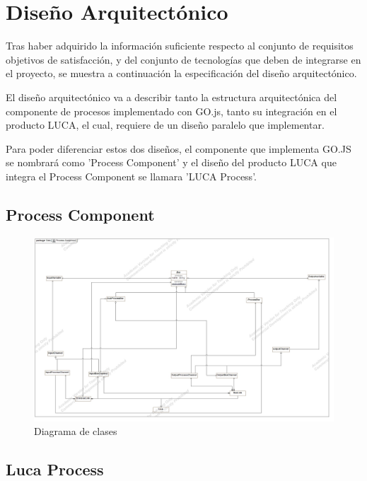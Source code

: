 \documentclass[a4paper,12pt]{book}
\begin{document}
	
	\clearpage
	
	\chapter{Diseño Arquitectónico}
	
	Tras haber adquirido la información suficiente respecto al conjunto de requisitos objetivos de satisfacción, y del conjunto de tecnologías que deben de integrarse en el proyecto, se muestra a continuación la especificación del diseño arquitectónico.
	
	\vspace{5mm}
	
	El diseño arquitectónico va a describir tanto la estructura arquitectónica del componente de procesos implementado con GO.js, tanto su integración en el producto LUCA, el cual, requiere de un diseño paralelo que implementar.
	
	
	\minitoc
	
	
	Para poder diferenciar estos dos diseños, el componente que implementa GO.JS se nombrará como 'Process Component' y el diseño del producto LUCA que integra el Process Component se llamara 'LUCA Process'.
	
		\section{Process Component}
		
		
		\begin{figure}[H]
			\centering
			\includegraphics[scale=0.25]{Process-Component.jpg}
			\caption{Diagrama de clases}\label{fig:Process-Component}
		\end{figure}
		
		
		\section{Luca Process}
		
\end{document}
